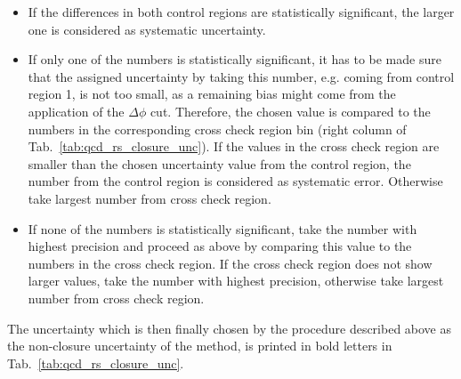 \begin{itemize}
 \item If the differences in both control regions are statistically significant, the larger one is considered as systematic uncertainty. 
 \item If only one of the numbers is statistically significant, it has to be made sure that the assigned uncertainty by taking this number, e.g. coming from control region 1, is not too small, as a remaining bias might come from the application of the $\Delta \phi$ cut. Therefore, the chosen value is compared to the numbers in the corresponding cross check region bin (right column of Tab.~\ref{tab:qcd_rs_closure_unc}). If the values in the cross check region are smaller than the chosen uncertainty value from the control region, the number from the control region is considered as systematic error. Otherwise take largest number from cross check region.
 \item If none of the numbers is statistically significant, take the number with highest precision and proceed as above by comparing this value to the numbers in the cross check region. If the cross check region does not show larger values, take the number with highest precision, otherwise take largest number from cross check region.
\end{itemize}
The uncertainty which is then finally chosen by the procedure described above as the non-closure uncertainty of the method, is printed in bold letters in Tab.~\ref{tab:qcd_rs_closure_unc}.

